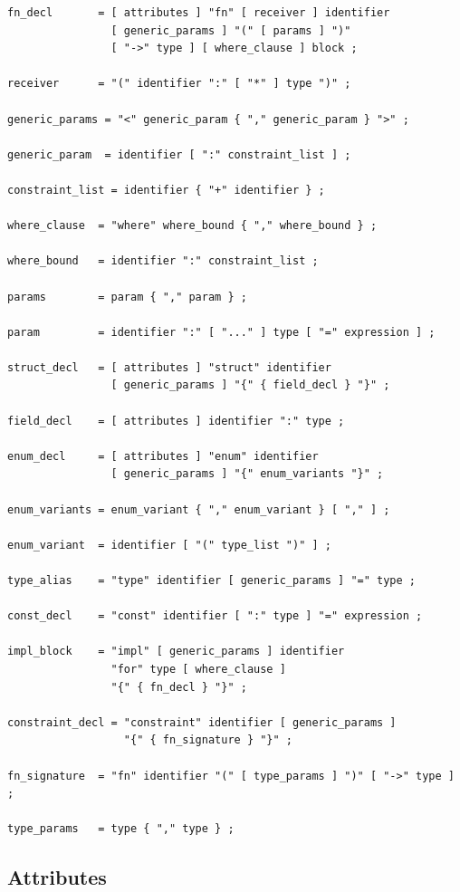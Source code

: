 \begin{lstlisting}[language=EBNF]
fn_decl       = [ attributes ] "fn" [ receiver ] identifier
                [ generic_params ] "(" [ params ] ")"
                [ "->" type ] [ where_clause ] block ;

receiver      = "(" identifier ":" [ "*" ] type ")" ;

generic_params = "<" generic_param { "," generic_param } ">" ;

generic_param  = identifier [ ":" constraint_list ] ;

constraint_list = identifier { "+" identifier } ;

where_clause  = "where" where_bound { "," where_bound } ;

where_bound   = identifier ":" constraint_list ;

params        = param { "," param } ;

param         = identifier ":" [ "..." ] type [ "=" expression ] ;

struct_decl   = [ attributes ] "struct" identifier
                [ generic_params ] "{" { field_decl } "}" ;

field_decl    = [ attributes ] identifier ":" type ;

enum_decl     = [ attributes ] "enum" identifier
                [ generic_params ] "{" enum_variants "}" ;

enum_variants = enum_variant { "," enum_variant } [ "," ] ;

enum_variant  = identifier [ "(" type_list ")" ] ;

type_alias    = "type" identifier [ generic_params ] "=" type ;

const_decl    = "const" identifier [ ":" type ] "=" expression ;

impl_block    = "impl" [ generic_params ] identifier
                "for" type [ where_clause ]
                "{" { fn_decl } "}" ;

constraint_decl = "constraint" identifier [ generic_params ]
                  "{" { fn_signature } "}" ;

fn_signature  = "fn" identifier "(" [ type_params ] ")" [ "->" type ] ;

type_params   = type { "," type } ;
\end{lstlisting}

\subsection{Attributes}

